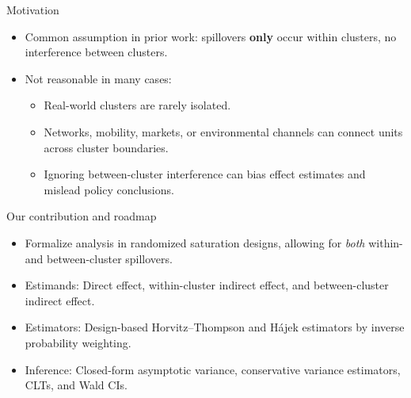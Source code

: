 \documentclass[aspectratio=169]{beamer}
\begin{document}
\begin{frame}{Motivation}
\begin{itemize}
    \item Common assumption in prior work: spillovers \textbf{only} occur within clusters, no interference between clusters.
    \pause
    \item Not reasonable in many cases:
    \begin{itemize}
      \item Real-world clusters are rarely isolated.
      \item Networks, mobility, markets, or environmental channels can connect units across cluster boundaries.
      \item Ignoring between-cluster interference can bias effect estimates and mislead policy conclusions.
    \end{itemize} 
\end{itemize}
\end{frame}
\begin{frame}{Our contribution and roadmap}
\begin{itemize}
    \item Formalize analysis in randomized saturation designs, allowing for \emph{both} within- and between-cluster spillovers.
    \pause
    \item {Estimands}: Direct effect, within-cluster indirect effect, and between-cluster indirect effect.
    \pause
    \item {Estimators}: Design-based Horvitz--Thompson and H\'{a}jek estimators by inverse probability weighting.
    \pause
    \item {Inference}: Closed-form asymptotic variance, conservative variance estimators, CLTs, and Wald CIs. 
\end{itemize}  
\end{frame}
\end{document}
